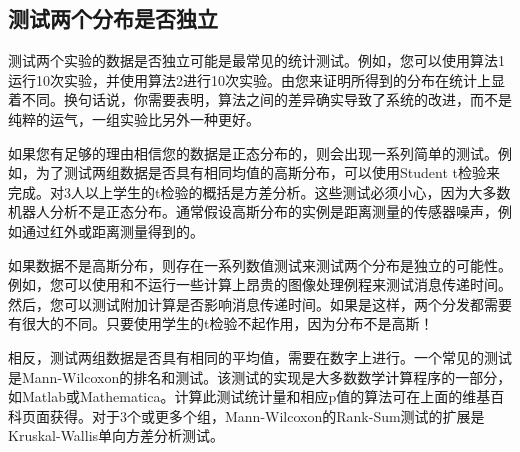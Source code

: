 

\subsection{测试两个分布是否独立}
测试两个实验的数据是否独立可能是最常见的统计测试。例如，您可以使用算法1运行10次实验，并使用算法2进行10次实验。由您来证明所得到的分布在统计上显着不同。换句话说，你需要表明，算法之间的差异确实导致了系统的改进，而不是纯粹的运气，一组实验比另外一种更好。

如果您有足够的理由相信您的数据是正态分布的，则会出现一系列简单的测试。例如，为了测试两组数据是否具有相同均值的高斯分布，可以使用Student t检验来完成。对3人以上学生的t检验的概括是方差分析。这些测试必须小心，因为大多数机器人分析不是正态分布。通常假设高斯分布的实例是距离测量的传感器噪声，例如通过红外或距离测量得到的。

如果数据不是高斯分布，则存在一系列数值测试来测试两个分布是独立的可能性。例如，您可以使用和不运行一些计算上昂贵的图像处理例程来测试消息传递时间。然后，您可以测试附加计算是否影响消息传递时间。如果是这样，两个分发都需要有很大的不同。只要使用学生的t检验不起作用，因为分布不是高斯！

相反，测试两组数据是否具有相同的平均值，需要在数字上进行。一个常见的测试是Mann-Wilcoxon的排名和测试。该测试的实现是大多数数学计算程序的一部分，如Matlab或Mathematica。计算此测试统计量和相应p值的算法可在上面的维基百科页面获得。对于3个或更多个组，Mann-Wilcoxon的Rank-Sum测试的扩展是Kruskal-Wallis单向方差分析测试。


